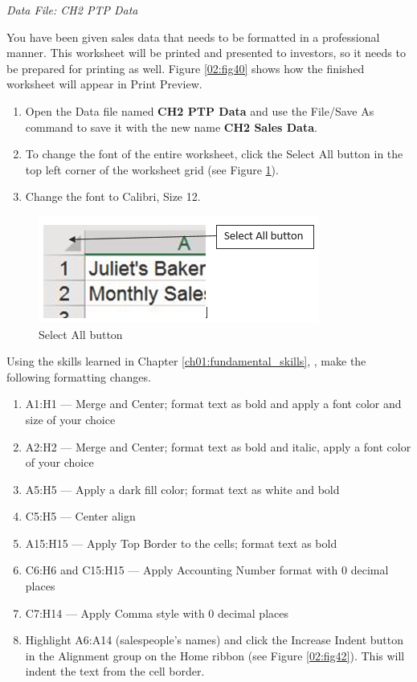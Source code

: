 \textit{Data File: CH2 PTP Data}

You have been given sales data that needs to be formatted in a professional manner. This worksheet will be printed and presented to investors, so it needs to be prepared for printing as well. Figure \ref{02:fig40} shows how the finished worksheet will appear in Print Preview.

\begin{enumerate}
	\item Open the Data file named \textbf{CH2 PTP Data} and use the File/Save As command to save it with the new name \textbf{CH2 Sales Data}.
	\item To change the font of the entire worksheet, click the Select All button in the top left corner of the worksheet grid (see Figure \ref{02:fig41}).
	\item Change the font to Calibri, Size 12.
\end{enumerate}

\begin{figure}[H]
	\centering
	\includegraphics[width=\maxwidth{.95\linewidth}]{gfx/ch02_fig41}
	\caption{Select All button}
	\label{02:fig41}
\end{figure}

Using the skills learned in Chapter \ref{ch01:fundamental_skills}, , make the following formatting changes.

\begin{enumerate}
	\item \textsf{A1:H1} --- Merge and Center; format text as bold and apply a font color and size of your choice
	\item \textsf{A2:H2} --- Merge and Center; format text as bold and italic, apply a font color of your choice
	\item \textsf{A5:H5} --- Apply a dark fill color; format text as white and bold
	\item \textsf{C5:H5} --- Center align
	\item \textsf{A15:H15} --- Apply Top Border to the cells; format text as bold
	\item \textsf{C6:H6} and \textsf{C15:H15} --- Apply Accounting Number format with $ 0 $ decimal places
	\item \textsf{C7:H14} --- Apply Comma style with $ 0 $ decimal places
	\item Highlight \textsf{A6:A14} (salespeople's names) and click the Increase Indent button in the Alignment group on the Home ribbon (see Figure \ref{02:fig42}). This will indent the text from the cell border.
\end{enumerate}

